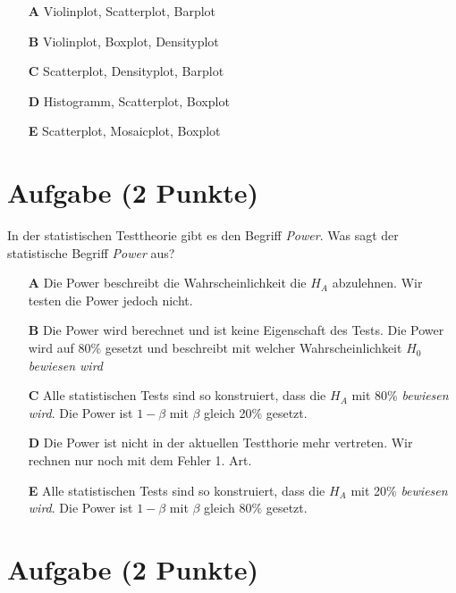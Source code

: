 \documentclass[a4paper, 9pt]{scrartcl}\usepackage[]{graphicx}\usepackage[]{xcolor}
\begin{document}
\begin{enumerate}
\item [\textbf{A} \msquare] Violinplot, Scatterplot, Barplot
\item [\textbf{B} \msquare] Violinplot, Boxplot, Densityplot
\item [\textbf{C} \msquare] Scatterplot, Densityplot, Barplot
\item [\textbf{D} \msquare] Histogramm, Scatterplot, Boxplot
\item [\textbf{E} \msquare] Scatterplot, Mosaicplot, Boxplot
\end{enumerate} 

\section{Aufgabe \hfill (2 Punkte)}



In der statistischen Testtheorie gibt es den Begriff \textit{Power}. Was sagt der statistische Begriff \textit{Power} aus?



\begin{enumerate}
\item [\textbf{A} \msquare] Die Power beschreibt die Wahrscheinlichkeit die $H_A$ abzulehnen. Wir testen die Power jedoch nicht.
\item [\textbf{B} \msquare] Die Power wird berechnet und ist keine Eigenschaft des Tests. Die Power wird auf $80\%$ gesetzt und beschreibt mit welcher Wahrscheinlichkeit $H_0$ \textit{bewiesen wird}
\item [\textbf{C} \msquare] Alle statistischen Tests sind so konstruiert, dass die $H_A$ mit 80\% \textit{bewiesen wird}. Die Power ist $1-\beta$ mit $\beta$ gleich 20\% gesetzt.
\item [\textbf{D} \msquare] Die Power ist nicht in der aktuellen Testthorie mehr vertreten. Wir rechnen nur noch mit dem Fehler 1. Art.
\item [\textbf{E} \msquare] Alle statistischen Tests sind so konstruiert, dass die $H_A$ mit 20\% \textit{bewiesen wird}. Die Power ist $1-\beta$ mit $\beta$ gleich 80\% gesetzt.
\end{enumerate} 

\section{Aufgabe \hfill (2 Punkte)}
\end{document}

